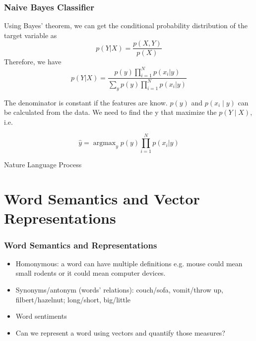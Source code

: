 \documentclass[notheorems, aspectratio=54]{beamer}
\DeclareMathOperator*{\argmax}{argmax} %
\begin{document}
\begin{frame}
    \frametitle{Naive Bayes Classifier}
Using Bayes' theorem, we can get the conditional probability distribution of the target variable as
$$
p(Y|X)=\frac{p(X,Y)}{p(X)}
$$
Therefore, we have 
$$
p(Y|X)=\frac{p(y)\prod\limits_{i=1}^{N}p(x_i|y)}{\sum\limits_{y}p(y)\prod\limits_{i=1}^{N}p(x_i|y)}
$$

The denominator is constant if the features are know. $p(y)$ and $p(x_i\mid y)$ can be calculated from the data. We need to find the y that maximize the $p(Y\mid X)$, i.e.

$$
\hat{y}=\argmax_{y}p(y)\prod\limits_{i=1}^{N}p(x_i|y)
$$

\end{frame}


\begin{frame}
\begin{center}
Nature Language Process
\end{center}
\end{frame}

\section{Word Semantics and Vector Representations}
\begin{frame}
\frametitle{Word Semantics and Representations}
\begin{itemize} 
\item Homonymous: a word can have multiple definitions e.g. mouse could mean small rodents or it could mean computer devices. 
\item Synonyms/antonym (words' relations): couch/sofa, vomit/throw up, filbert/hazelnut; long/short, big/little
\item Word sentiments
\item Can we represent a word using vectors and quantify those measures?
\end{itemize}

\end{frame}
\end{document}
